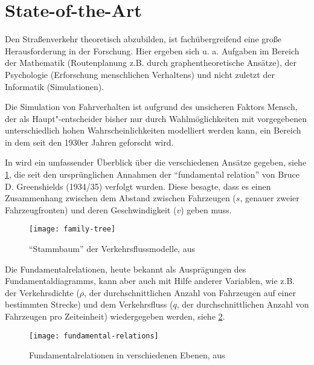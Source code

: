 \section{State-of-the-Art}
\label{sec:sota}


Den Straßenverkehr theoretisch abzubilden, ist fachübergreifend eine große Herausforderung in der Forschung.
Hier ergeben sich u. a. Aufgaben im Bereich der Mathematik (Routenplanung z.B. durch graphentheoretische Ansätze), der Psychologie (Erforschung menschlichen Verhaltens) und nicht zuletzt der Informatik (Simulationen).

Die Simulation von Fahrverhalten ist aufgrund des unsicheren Faktors Mensch, der als Haupt"-entscheider bisher nur durch Wahlmöglichkeiten mit vorgegebenen unterschiedlich hohen Wahrscheinlichkeiten modelliert werden kann, ein Bereich in dem seit den 1930er Jahren geforscht wird.

In \cite{genealogy} wird ein umfassender Überblick über die verschiedenen Ansätze gegeben, siehe \cref{figure:family-tree}, die seit den ursprünglichen Annahmen der \enquote{fundamental relation} von Bruce D. Greenshields (1934/35) verfolgt wurden. 
Diese besagte, dass es einen Zusammenhang zwischen dem Abstand zwischen Fahrzeugen ($s$, genauer zweier Fahrzeugfronten) und deren Geschwindigkeit ($v$) geben muss.

\begin{figure}[hptb]
 \centering
 \texttt{[image: family-tree]}
 \caption[Überblick über die Entwicklung der Verkehrsflussmodelle]
 		{\enquote{Stammbaum} der Verkehrsflussmodelle, aus \cite{genealogy}}
 \label{figure:family-tree}
\end{figure}

\noindent
Die Fundamentalrelationen, heute bekannt als Ausprägungen des Fundamentaldiagramms, kann aber auch mit Hilfe anderer Variablen, wie z.B. der Verkehrsdichte ($\rho$, der durchschnittlichen Anzahl von Fahrzeugen auf einer bestimmten Strecke) und dem Verkehrsfluss ($q$, der durchschnittlichen Anzahl von Fahrzeugen pro Zeiteinheit) wiedergegeben werden, siehe \cref{figure:fundamental-relations}. 

\begin{figure}[hptb]
 \centering
 \texttt{[image: fundamental-relations]}
 \caption[Fundamentalrelationen in verschiedenen Ebenen]
 		{Fundamentalrelationen in verschiedenen Ebenen, aus \cite{genealogy}}
 \label{figure:fundamental-relations}
\end{figure}

